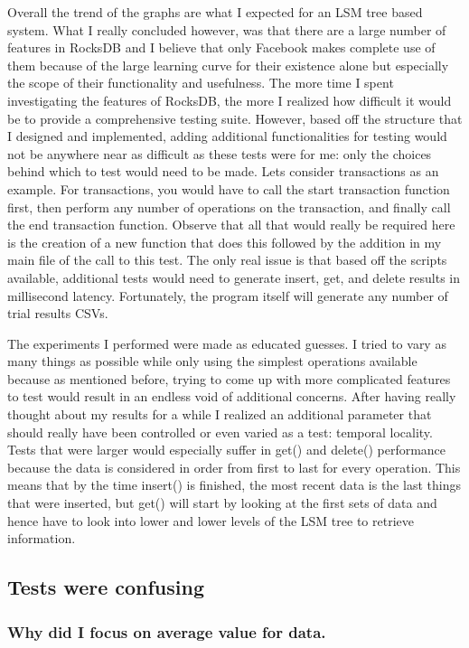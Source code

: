 \documentclass[11pt]{article}
\begin{document}
Overall the trend of the graphs are what I expected for an LSM tree based
system. What I really concluded however, was that there are a large number of
features in RocksDB and I believe that only Facebook makes complete use of them
because of the large learning curve for their existence alone but especially the
scope of their functionality and usefulness. The more time I spent investigating
the features of RocksDB, the more I realized how difficult it would be to
provide a comprehensive testing suite. However, based off the structure that I
designed and implemented, adding additional functionalities for testing would
not be anywhere near as difficult as these tests were for me: only the choices
behind which to test would need to be made. Lets consider transactions as an
example. For transactions, you would have to call the start transaction function
first, then perform any number of operations on the transaction, and finally
call the end transaction function. Observe that all that would really be
required here is the creation of a new function that does this followed by the
addition in my main file of the call to this test. The only real issue is that
based off the scripts available, additional tests would need to generate insert,
get, and delete results in millisecond latency. Fortunately, the program itself
will generate any number of trial results CSVs.

The experiments I performed were made as educated guesses. I tried to vary as
many things as possible while only using the simplest operations available
because as mentioned before, trying to come up with more complicated features to
test would result in an endless void of additional concerns. After having really
thought about my results for a while I realized an additional parameter that
should really have been controlled or even varied as a test: temporal locality.
Tests that were larger would especially suffer in get() and delete() performance
because the data is considered in order from first to last for every operation.
This means that by the time insert() is finished, the most recent data is the
last things that were inserted, but get() will start by looking at the first
sets of data and hence have to look into lower and lower levels of the LSM tree
to retrieve information.

\subsection{Tests were confusing}

\subsubsection{Why did I focus on average value for data.}
\end{document}
